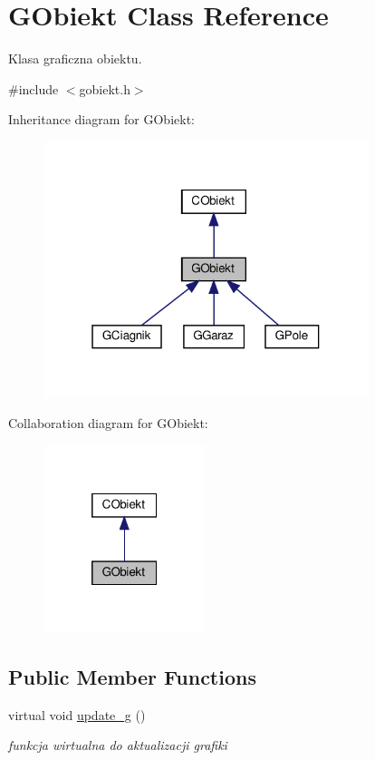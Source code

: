 \hypertarget{class_g_obiekt}{}\section{G\+Obiekt Class Reference}
\label{class_g_obiekt}


Klasa graficzna obiektu.  




{\ttfamily \#include $<$gobiekt.\+h$>$}



Inheritance diagram for G\+Obiekt\+:\nopagebreak
\begin{figure}[H]
\begin{center}
\leavevmode
\includegraphics[width=268pt]{class_g_obiekt__inherit__graph}
\end{center}
\end{figure}


Collaboration diagram for G\+Obiekt\+:\nopagebreak
\begin{figure}[H]
\begin{center}
\leavevmode
\includegraphics[width=133pt]{class_g_obiekt__coll__graph}
\end{center}
\end{figure}
\subsection*{Public Member Functions}
\begin{DoxyCompactItemize}
\item 
\mbox{\label{class_g_obiekt_acddaf8faec1ba068bce634fef949042b}} 
virtual void \mbox{\hyperlink{class_g_obiekt_acddaf8faec1ba068bce634fef949042b}{update\+\_\+g}} ()
\begin{DoxyCompactList}\small\item\em funkcja wirtualna do aktualizacji grafiki \end{DoxyCompactList}\end{DoxyCompactItemize}
